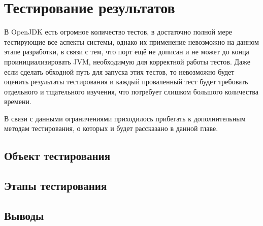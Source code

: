 \section{Тестирование результатов}

В OpenJDK есть огромное количество тестов, в достаточно полной мере тестирующие все аспекты системы, однако их применение невозможно на данном этапе разработки, в связи с тем, что порт ещё не дописан и не может до конца проинициализировать JVM, необходимую для корректной работы тестов.
Даже если сделать обходной путь для запуска этих тестов, то невозможно будет оценить результаты тестирования и каждый проваленный тест будет требовать отдельного и тщательного изучения, что потребует слишком большого количества времени.

В связи с данными ограничениями приходилось прибегать к дополнительным методам тестирования, о которых и будет рассказано в данной главе.

\subsection{Объект тестирования}

\subsection{Этапы тестирования}

\subsection{Выводы}
